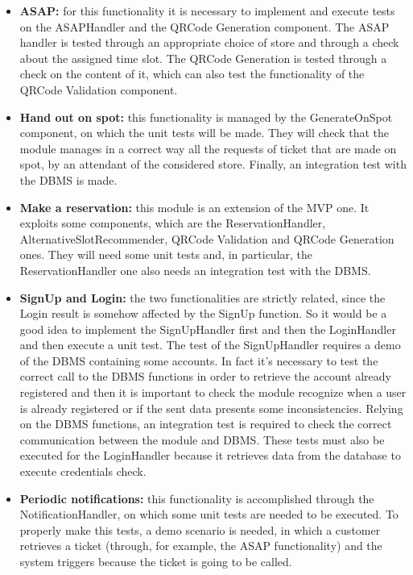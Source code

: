 \documentclass[table, 12pt]{article}
\begin{document}
\begin{itemize}
    \item \textbf{ASAP:} for this functionality it is necessary to implement and execute tests on the ASAPHandler and the QRCode Generation component. The ASAP handler is tested through an appropriate choice of store and through a check about the assigned time slot. The QRCode Generation is tested through a check on the content of it, which can also test the functionality of the QRCode Validation component.
    \item \textbf{Hand out on spot:} this functionality is managed by the GenerateOnSpot component, on which the unit tests will be made. They will check that the module manages in a correct way all the requests of ticket that are made on spot, by an attendant of the considered store. Finally, an integration test with the DBMS is made.
    \item \textbf{Make a reservation:} this module is an extension of the MVP one. It exploits some components, which are the ReservationHandler, AlternativeSlotRecommender, QRCode Validation and QRCode Generation ones. They will need some unit tests and, in particular, the ReservationHandler one also needs an integration test with the DBMS.
    \item \textbf{SignUp and Login:} the two functionalities are strictly related, since the Login result is somehow affected by the SignUp function. So it would be a good idea to implement the SignUpHandler first and then the LoginHandler and then execute a unit test. The test of the SignUpHandler requires a demo of the DBMS containing some accounts. In fact it’s necessary to test the correct call to the DBMS functions in order to retrieve the account already registered and then it is important to check the module recognize when a user is already registered or if the sent data presents some inconsistencies. Relying on the DBMS functions, an integration test is required to check the correct communication between the module and DBMS. These tests must also be executed for the LoginHandler because it retrieves data from the database to execute credentials check.
    \item \textbf{Periodic notifications:} this functionality is accomplished through the NotificationHandler, on which some unit tests are needed to be executed. To properly make this tests, a demo scenario is needed, in which a customer retrieves a ticket (through, for example, the ASAP functionality) and the system triggers because the ticket is going to be called.
\end{itemize}
\end{document}
